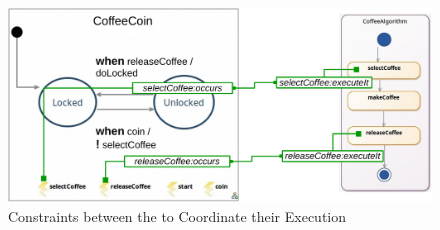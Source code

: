	\begin{figure}[h]
		\begin{center}
			\includegraphics[width=.7\textwidth]{bcool/figs/tfsmandadcoord}
			\caption{Constraints between the \mse to Coordinate their Execution}
			\label{fig:tfsmandadcoord}
		\end{center}
	\end{figure}

